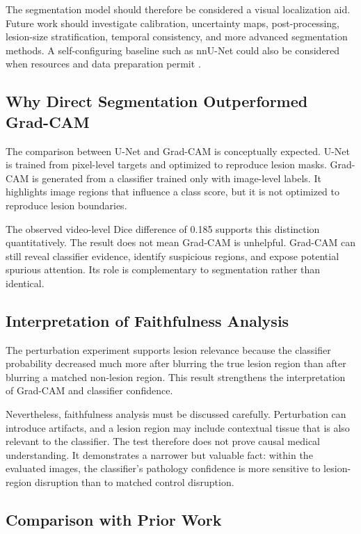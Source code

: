 The segmentation model should therefore be considered a visual localization aid. Future work should investigate calibration, uncertainty maps, post-processing, lesion-size stratification, temporal consistency, and more advanced segmentation methods. A self-configuring baseline such as nnU-Net could also be considered when resources and data preparation permit \cite{isensee2021nnunet}.

\subsection{Why Direct Segmentation Outperformed Grad-CAM}

The comparison between U-Net and Grad-CAM is conceptually expected. U-Net is trained from pixel-level targets and optimized to reproduce lesion masks. Grad-CAM is generated from a classifier trained only with image-level labels. It highlights image regions that influence a class score, but it is not optimized to reproduce lesion boundaries.

The observed video-level Dice difference of 0.185 supports this distinction quantitatively. The result does not mean Grad-CAM is unhelpful. Grad-CAM can still reveal classifier evidence, identify suspicious regions, and expose potential spurious attention. Its role is complementary to segmentation rather than identical.

\subsection{Interpretation of Faithfulness Analysis}

The perturbation experiment supports lesion relevance because the classifier probability decreased much more after blurring the true lesion region than after blurring a matched non-lesion region. This result strengthens the interpretation of Grad-CAM and classifier confidence.

Nevertheless, faithfulness analysis must be discussed carefully. Perturbation can introduce artifacts, and a lesion region may include contextual tissue that is also relevant to the classifier. The test therefore does not prove causal medical understanding. It demonstrates a narrower but valuable fact: within the evaluated images, the classifier's pathology confidence is more sensitive to lesion-region disruption than to matched control disruption.

\subsection{Comparison with Prior Work}

